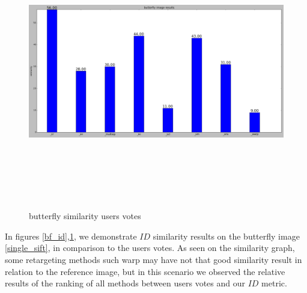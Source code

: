 		\begin{figure}[h] \label{bf_usr}
			\includegraphics[width=\linewidth,height=12cm,keepaspectratio]{Figures/bf_usr}
			\caption[butterfly similarity users votes]
			{butterfly similarity users votes}
		\end{figure}
		
In figures \ref{bf_id},\ref{bf_usr}, we demonstrate $ID$ similarity results on the butterfly image \ref{single_sift}, in comparison to the users votes. As seen on the similarity graph, some retargeting methods such warp \cite{warp} may have not that good similarity result in relation to the reference image, but in this scenario we observed the relative results of the ranking of all methods between users votes and our $ID$ metric.
		
		
